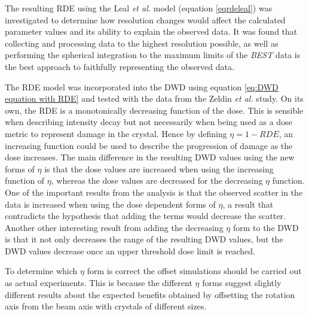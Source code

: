 The resulting RDE using the Leal \textit{et al.}  model (equation \ref{eqrdeleal}) was investigated to determine how resolution changes would affect the calculated parameter values and its ability to explain the observed data.
It was found that collecting and processing data to the highest resolution possible, as well as performing the spherical integration to the maximum limits of the \textit{BEST} data is the best approach to faithfully representing the observed data.

The RDE model was incorporated into the DWD using equation \ref{eq:DWD equation with RDE} and tested with the data from the Zeldin \textit{et al.} study.
On its own, the RDE is a monotonically decreasing function of the dose.
This is sensible when describing intensity decay but not necessarily when being used as a dose metric to represent damage in the crystal.
Hence by defining $\eta = 1 - RDE$, an increasing function could be used to describe the progression of damage as the dose increases.
The main difference in the resulting DWD values using the new forms of $\eta$ is that the dose values are increased when using the increasing function of $\eta$, whereas the dose values are decreased for the decreasing $\eta$ function.
One of the important results from the analysis is that the observed scatter in the data is increased when using the dose dependent forms of $\eta$, a result that contradicts the hypothesis that adding the terms would decrease the scatter.
Another other interesting result from adding the decreasing $\eta$ form to the DWD is that it not only decreases the range of the resulting DWD values, but the DWD values decrease once an upper threshold dose limit is reached.

To determine which $\eta$ form is correct the offset simulations should be carried out as actual experiments.
This is because the different $\eta$ forms suggest slightly different results about the expected benefits obtained by offsetting the rotation axis from the beam axis with crystals of different sizes.

